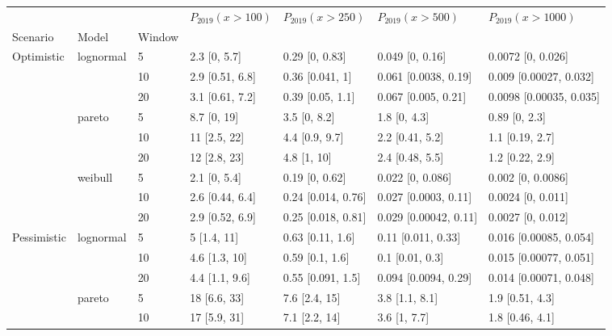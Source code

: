 \begin{tabular}{lllllll}
\toprule
           &         &    & $P_{2019}(x>100)$ &   $P_{2019}(x>250)$ &      $P_{2019}(x>500)$ &       $P_{2019}(x>1000)$ \\
Scenario & Model & Window &                   &                     &                        &                          \\
\midrule
Optimistic & lognormal & 5  &      2.3 [0, 5.7] &      0.29 [0, 0.83] &        0.049 [0, 0.16] &        0.0072 [0, 0.026] \\
           &         & 10 &   2.9 [0.51, 6.8] &     0.36 [0.041, 1] &   0.061 [0.0038, 0.19] &   0.009 [0.00027, 0.032] \\
           &         & 20 &   3.1 [0.61, 7.2] &    0.39 [0.05, 1.1] &    0.067 [0.005, 0.21] &  0.0098 [0.00035, 0.035] \\
           & pareto & 5  &       8.7 [0, 19] &        3.5 [0, 8.2] &           1.8 [0, 4.3] &            0.89 [0, 2.3] \\
           &         & 10 &      11 [2.5, 22] &      4.4 [0.9, 9.7] &        2.2 [0.41, 5.2] &          1.1 [0.19, 2.7] \\
           &         & 20 &      12 [2.8, 23] &         4.8 [1, 10] &        2.4 [0.48, 5.5] &          1.2 [0.22, 2.9] \\
           & weibull & 5  &      2.1 [0, 5.4] &      0.19 [0, 0.62] &       0.022 [0, 0.086] &        0.002 [0, 0.0086] \\
           &         & 10 &   2.6 [0.44, 6.4] &  0.24 [0.014, 0.76] &   0.027 [0.0003, 0.11] &        0.0024 [0, 0.011] \\
           &         & 20 &   2.9 [0.52, 6.9] &  0.25 [0.018, 0.81] &  0.029 [0.00042, 0.11] &        0.0027 [0, 0.012] \\
Pessimistic & lognormal & 5  &       5 [1.4, 11] &    0.63 [0.11, 1.6] &     0.11 [0.011, 0.33] &   0.016 [0.00085, 0.054] \\
           &         & 10 &     4.6 [1.3, 10] &     0.59 [0.1, 1.6] &        0.1 [0.01, 0.3] &   0.015 [0.00077, 0.051] \\
           &         & 20 &    4.4 [1.1, 9.6] &   0.55 [0.091, 1.5] &   0.094 [0.0094, 0.29] &   0.014 [0.00071, 0.048] \\
           & pareto & 5  &      18 [6.6, 33] &       7.6 [2.4, 15] &         3.8 [1.1, 8.1] &          1.9 [0.51, 4.3] \\
           &         & 10 &      17 [5.9, 31] &       7.1 [2.2, 14] &           3.6 [1, 7.7] &          1.8 [0.46, 4.1] \\

\end{tabular}
